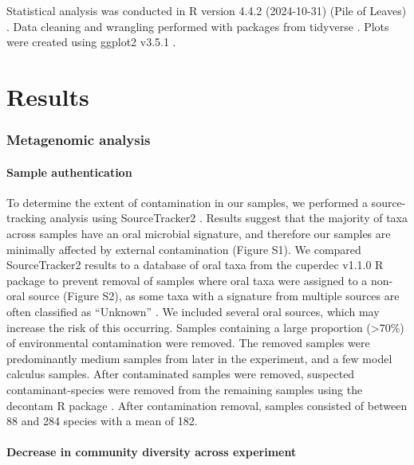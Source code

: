 \documentclass[10pt,a4paper]{article}
\begin{document}
Statistical analysis was conducted in R version 4.4.2 (2024-10-31) (Pile
of Leaves) \citep{Rbase}. Data cleaning and wrangling performed with
packages from tidyverse \citep{tidyverse2019}. Plots were created using
ggplot2 v3.5.1 \citep{ggplot2}.


\section*{Results}\label{results}

\subsubsection*{Metagenomic analysis}\label{metagenomic-analysis}

\paragraph{Sample authentication}\label{sample-authentication}

To determine the extent of contamination in our samples, we performed a
source-tracking analysis using SourceTracker2
\citep{knightsSourceTracker2011}. Results suggest that the majority of
taxa across samples have an oral microbial signature, and therefore our
samples are minimally affected by external contamination (Figure S1). We
compared SourceTracker2 results to a database of oral taxa from the
cuperdec v1.1.0 R package \citep{yatesOralMicrobiome2021} to prevent
removal of samples where oral taxa were assigned to a non-oral source
(Figure S2), as some taxa with a signature from multiple sources are
often classified as ``Unknown'' \citep{velskoMicrobialDifferences2019}.
We included several oral sources, which may increase the risk of this
occurring. Samples containing a large proportion (\textgreater70\%) of
environmental contamination were removed. The removed samples were
predominantly medium samples from later in the experiment, and a few
model calculus samples. After contaminated samples were removed,
suspected contaminant-species were removed from the remaining samples
using the decontam R package \citep{Rdecontam}. After contamination
removal, samples consisted of between 88 and 284 species with a mean of
182.

\paragraph{Decrease in community diversity across
experiment}\label{decrease-in-community-diversity-across-experiment}
\end{document}
